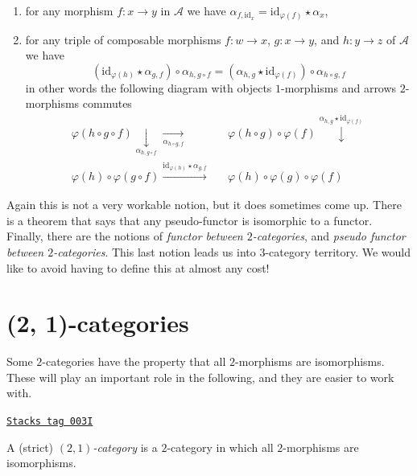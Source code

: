 \begin{definition}
\begin{enumerate}
\begin{enumerate}
$$$$
\item for any morphism $f : x \to y$ in $\mathcal{A}$ we have
$\alpha_{f, \text{id}_x} = \text{id}_{\varphi(f)} \star \alpha_x$,
\item for any triple of composable morphisms
$f : w \to x$, $g : x \to y$, and $h : y \to z$ of $\mathcal{A}$
we have
$$
(\text{id}_{\varphi(h)} \star \alpha_{g, f})
\circ
\alpha_{h, g \circ f}
=
(\alpha_{h, g} \star \text{id}_{\varphi(f)})
\circ
\alpha_{h \circ g, f}
$$
in other words the following diagram with objects
$1$-morphisms and arrows $2$-morphisms commutes
$$
\begin{array}{ccc}\varphi(h \circ g \circ f)
\underset{\alpha_{h, g \circ f}}{\downarrow}\underset{\alpha_{h \circ g, f}}{\longrightarrow} &  & \varphi(h \circ g) \circ \varphi(f)
\overset{\alpha_{h, g} \star \text{id}_{\varphi(f)}}{\downarrow} \\ \varphi(h) \circ \varphi(g \circ f)
\overset{\text{id}_{\varphi(h)} \star \alpha_{g, f}}{\longrightarrow} &  & \varphi(h) \circ \varphi(g) \circ \varphi(f)\end{array}
$$
\end{enumerate}
\end{enumerate}
\end{definition}

Again this is not a very workable notion, but it does sometimes come up.
There is a theorem that says that any pseudo-functor is isomorphic to
a functor. Finally, there are the notions of
{\it functor between $2$-categories}, and
{\it pseudo functor between $2$-categories}.
This last notion leads us into $3$-category territory.
We would like to avoid having to define this at almost any cost!

\section{(2, 1)-categories}
\label{categories-section-2-1-categories}
Some $2$-categories have
the property that all $2$-morphisms are isomorphisms. These will
play an important role in the following, and they are easier to work with.

\begin{definition}[2 1 category]
\label{categories-definition-2-1-category}
\href{https://stacks.math.columbia.edu/tag/003I}{\texttt{Stacks tag 003I}}

A (strict) {\it $(2, 1)$-category} is a $2$-category in which all
$2$-morphisms are isomorphisms.
\end{definition}

